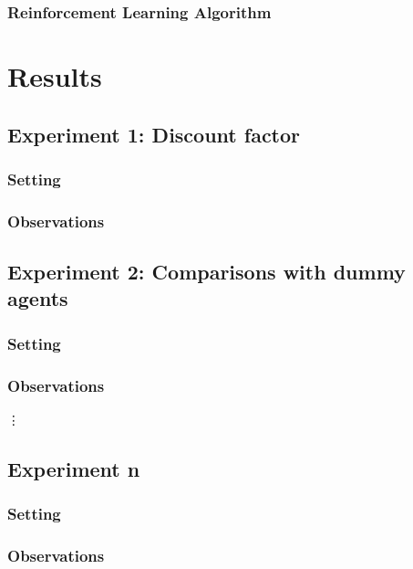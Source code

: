 \documentclass[11pt]{article}
\begin{document}
\subsubsection{Reinforcement Learning Algorithm}


\section{Results}

\subsection{Experiment 1: Discount factor}

\subsubsection{Setting}

\subsubsection{Observations}

\subsection{Experiment 2: Comparisons with dummy agents}

\subsubsection{Setting}

\subsubsection{Observations}

\vdots

\subsection{Experiment n}

\subsubsection{Setting}

\subsubsection{Observations}
\end{document}
